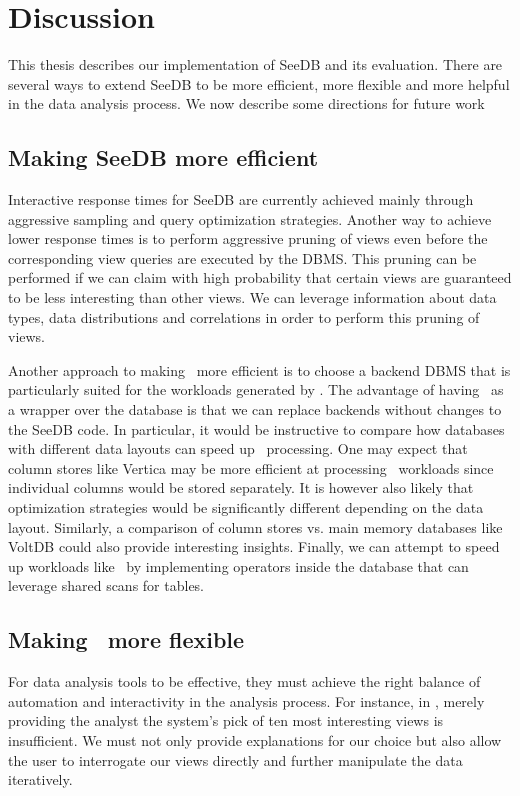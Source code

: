 \chapter{Discussion}
\label{sec:discussion}
This thesis describes our implementation of SeeDB and its evaluation.
There are several ways to extend SeeDB to be more efficient, more
flexible and more helpful in the data analysis process. We now describe some
directions for future work

\section{Making SeeDB more efficient} Interactive response times for SeeDB are
currently achieved mainly through aggressive sampling and query optimization
strategies. Another way to achieve lower response times is to perform aggressive
pruning of views even before the corresponding view queries are executed by the
DBMS.
This pruning can be performed if we can claim with high probability that certain
views are guaranteed to be less interesting than other views. We can leverage
information about data types, data distributions and correlations in order to
perform this pruning of views.


Another approach to making \SeeDB\ more efficient is to choose a backend DBMS
that is particularly suited for the workloads generated by \SeeDB.
The advantage of having \SeeDB\ as a wrapper over
the database is that we can replace backends without changes to the SeeDB code.
In particular, it would be instructive to compare how databases with different
data layouts can speed up \SeeDB\ processing. One may expect that column stores
like Vertica may be more efficient at processing \SeeDB\ workloads since
individual columns would be stored separately. It is however also likely that
optimization strategies would be significantly different depending on
the data layout.
Similarly, a comparison of column stores vs. main memory databases like VoltDB
could also provide interesting insights.
Finally, we can attempt to speed up workloads like \SeeDB\ by implementing
operators inside the database that can leverage shared scans for tables. 

\section{Making \SeeDB\ more flexible} For data analysis tools to be effective,
they must achieve the right balance of automation and interactivity in the analysis
process.
For instance, in \SeeDB, merely providing the analyst the system's pick of ten
most interesting views is insufficient. We must not only provide explanations
for our choice but also allow the user to interrogate our views directly and
further manipulate the data iteratively. 

